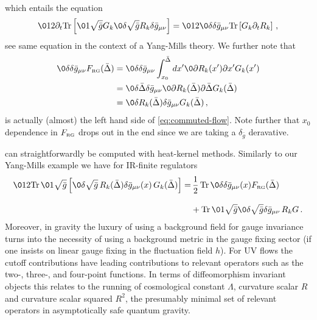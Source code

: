 \documentclass[11pt]{book} %
\newcommand{\Tr}{\mathrm{Tr}}
\begin{document}
{\begin{align}
\end{align}
which entails the equation
\begin{align} \label{eq:commuted-flow}
 \012 \partial_t \Tr \left[ \01{\sqrt{\bar g}} G_k \0{\delta  \sqrt{\bar g} R_k}{ \delta \bar g_{\mu\nu}}  \right]
 = \012 \0{\delta}{\delta \bar g_{\mu\nu}} \Tr \left[ G_k \partial_t R_k \right] \,,
\end{align}
see \cite{Litim:2002ce} same equation in the context of a Yang-Mills theory.
We further note that
\begin{align}
 \0{\delta}{\delta \bar g_{\mu\nu}} F_{\text{\tiny RG}}(\bar \Delta) 
 &= \0{\delta}{\delta \bar g_{\mu\nu}} \int_{x_0}^{\bar\Delta} d x' \0{\partial R_k(x')}{\partial x'} G_k(x') \notag \\
 &= \0{\delta \bar \Delta}{ \delta \bar g_{\mu\nu}} \0{\partial R_k(\bar \Delta)}{\partial \bar \Delta} G_k(\bar \Delta) \notag \\
 &= \0{\delta R_k(\bar \Delta)}{ \delta \bar g_{\mu\nu}} G_k(\bar \Delta)\,,
\end{align}
is actually (almost) the left hand side of \eqref{eq:commuted-flow}.
Note further that $x_0$ dependence in $F_{\text{\tiny RG}}$ drops out in the end since we are taking a $\delta_{\bar g}$ deravative.


 can straightforwardly be computed with heat-kernel methods.
Similarly to our Yang-Mills example we have for IR-finite regulators
\begin{align}\nonumber 
  \012 \Tr\, \0{1}{\sqrt{\bar g}}\left[\0{\delta \sqrt{\bar g} \, R_k(\bar \Delta)}{\delta \bar g_{\mu\nu}(x)}\,
  G_k(\bar \Delta )\right] =&  \, \frac{1}{2} \, \Tr\, \0{\delta }{\delta \bar g_{\mu\nu}(x)} F_{\text{\tiny{RG}}}(\bar\Delta)\\[2ex] 
                            & +
                              \Tr \, \0{1}{\sqrt{\bar g}}\0{\delta \sqrt{\bar g}}{\delta \bar g_{\mu\nu}}\, R_k G \,.
\label{eq:g-Rkg}
\end{align}
Moreover, in gravity the luxury of using a background field for gauge
invariance turns into the necessity of using a background metric in
the gauge fixing sector (if one insists on linear gauge fixing in the
fluctuation field $h$). For UV flows the cutoff contributions have
leading contributions to relevant operators such as the two-, three-,
and four-point functions. In terms of diffeomorphism invariant objects
this relates to the running of cosmological constant $\Lambda$,
curvature scalar $R$ and curvature scalar squared $R^2$, the presumably
minimal set of relevant operators in asymptotically safe quantum
gravity.

}
\end{document}
